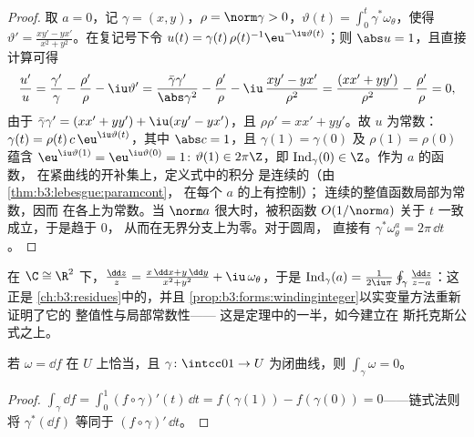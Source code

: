 \begin{proof}
取 $a = 0$，记 $\gamma = (x, y)$，$\rho =
\norm\gamma > 0$，$\vartheta(t) =
\int_0^t\gamma^*\omega_\theta$，使得 $\vartheta' =
\frac{xy' - yx'}{x^2 + y^2}$。在复记号下令 $u(t)
= \gamma(t)\,\rho(t)^{-1}\eu^{-\iu\vartheta(t)}$；则
$\abs u = 1$，且直接计算可得
\[
\frac{u'}{u} = \frac{\gamma'}{\gamma} - \frac{\rho'}{\rho}
- \iu\vartheta'
= \frac{\bar\gamma\gamma'}{\abs\gamma^2} -
\frac{\rho'}{\rho} - \iu\,\frac{xy' -
yx'}{\rho^2}
= \frac{(xx' + yy')}{\rho^2} - \frac{\rho'}{\rho} = 0,
\]
由于 $\bar\gamma\gamma' = (xx' + yy') + \iu(xy' - yx')$，且
$\rho\rho' = xx' + yy'$。故 $u$ 为常数：$\gamma(t) =
\rho(t)\,c\,\eu^{\iu\vartheta(t)}$，其中 $\abs c = 1$，且
$\gamma(1) = \gamma(0)$ 及 $\rho(1) = \rho(0)$ 蕴含
$\eu^{\iu\vartheta(1)} = \eu^{\iu\vartheta(0)} = 1$:
$\vartheta(1) \in 2\pi\Z$，即
$\operatorname{Ind}_\gamma(0) \in \Z$。作为 $a$ 的函数，
在紧曲线的开补集上，定义式中的积分
是连续的（由\cref{thm:b3:lebesgue:paramcont}，
在每个 $a$ 的上有控制）；
连续的整值函数局部为常数，因而
在各上为常数。当 $\norm a$ 很大时，被积函数
$O(1/\norm a)$ 关于 $t$ 一致成立，于是趋于 $0$，
从而在无界分支上为零。对于圆周，
直接有 $\gamma^*\omega_\theta^a = 2\pi\,\dd t$。
\end{proof}

\begin{remark}
在 $\C \cong \R^2$ 下，$\frac{\dd z}{z} = \frac{x\,\dd x +
y\,\dd y}{x^2 + y^2} + \iu\,\omega_\theta$，于是
$\operatorname{Ind}_\gamma(a) =
\frac1{2\iu\pi}\oint_\gamma\frac{\dd z}{z - a}$：这正是
\cref{ch:b3:residues}中的，并且
\cref{prop:b3:forms:windinginteger}以实变量方法重新证明了它的
整值性与局部常数性——
这是定理中的一半，如今建立在
斯托克斯公式之上。
\end{remark}

\begin{proposition}\label{prop:b3:forms:exactloop}
若 $\omega = \dd f$ 在 $U$ 上恰当，且
$\gamma\colon\intcc01\to U$ 为闭曲线，则
$\int_\gamma\omega = 0$。
\end{proposition}

\begin{proof}
$\int_\gamma\dd f = \int_0^1(f\circ\gamma)'(t)\,\dd t =
f(\gamma(1)) - f(\gamma(0)) = 0$——链式法则
将 $\gamma^*(\dd f)$ 等同于 $(f\circ\gamma)'\,\dd t$。
\end{proof}

